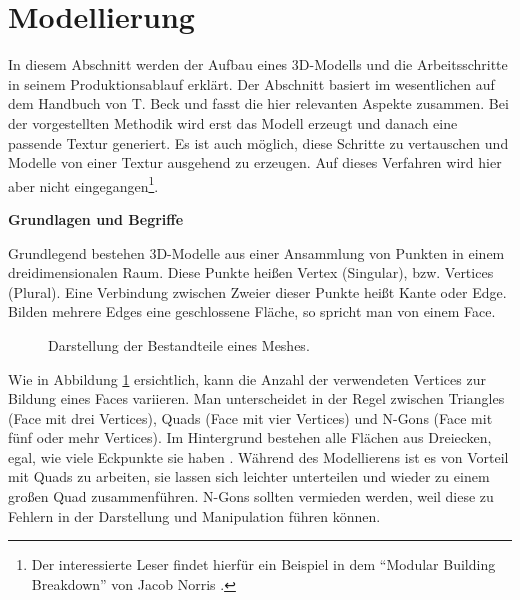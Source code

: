 \section{Modellierung}
In diesem Abschnitt werden der Aufbau eines 3D-Modells und die Arbeitsschritte in seinem Produktionsablauf erklärt. Der Abschnitt basiert im wesentlichen auf dem Handbuch von T. Beck \parencite{blender} und fasst die hier relevanten Aspekte zusammen. Bei der vorgestellten Methodik wird erst das Modell erzeugt und danach eine passende Textur generiert. Es ist auch möglich, diese Schritte zu vertauschen und Modelle von einer Textur ausgehend zu erzeugen. Auf dieses Verfahren wird hier aber nicht eingegangen\footnote{Der interessierte Leser findet hierfür ein Beispiel in dem \enquote{Modular Building Breakdown} von Jacob Norris \parencite{Norris}.}. 
\par\textbf{Grundlagen und Begriffe}
\par
Grundlegend bestehen 3D-Modelle aus einer Ansammlung von Punkten in einem dreidimensionalen Raum. Diese Punkte heißen Vertex (Singular), bzw. Vertices (Plural). Eine Verbindung zwischen Zweier dieser Punkte heißt Kante oder Edge. Bilden mehrere Edges eine geschlossene Fläche, so spricht man von einem Face.
\begin{figure}[H]
\centering
  \caption{Darstellung der Bestandteile eines Meshes.}
\label{BlenderCube}
\end{figure}
\vspace{-10.5pt}
Wie in Abbildung \ref{BlenderCube} ersichtlich, kann die Anzahl der verwendeten Vertices zur Bildung eines Faces variieren. Man unterscheidet in der Regel zwischen Triangles (Face mit drei Vertices), Quads (Face mit vier Vertices) und N-Gons (Face mit fünf oder mehr Vertices). Im Hintergrund bestehen alle Flächen aus Dreiecken, egal, wie viele Eckpunkte sie haben \parencite[S.\,82-83]{blender}. Während des Modellierens ist es von Vorteil mit Quads zu arbeiten, sie lassen sich leichter unterteilen und wieder zu einem großen Quad zusammenführen. N-Gons sollten vermieden werden, weil diese zu Fehlern in der Darstellung und Manipulation führen können.
